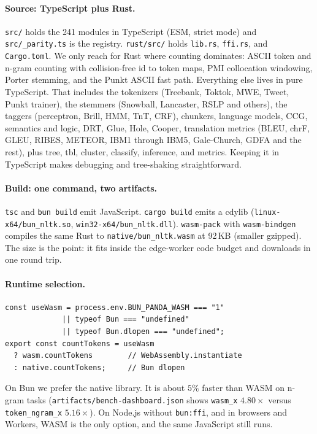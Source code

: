 \documentclass[smallextended]{svjour3}
\begin{document}
\paragraph{Source: TypeScript plus Rust.}
\texttt{src/} holds the 241 modules in TypeScript (ESM, strict mode) and \texttt{src/\_parity.ts} is the registry. \texttt{rust/src/} holds \texttt{lib.rs}, \texttt{ffi.rs}, and \texttt{Cargo.toml}. We only reach for Rust where counting dominates: ASCII token and n-gram counting with collision-free id to token maps, PMI collocation windowing, Porter stemming, and the Punkt ASCII fast path. Everything else lives in pure TypeScript. That includes the tokenizers (Treebank, Toktok, MWE, Tweet, Punkt trainer), the stemmers (Snowball, Lancaster, RSLP and others), the taggers (perceptron, Brill, HMM, TnT, CRF), chunkers, language models, CCG, semantics and logic, DRT, Glue, Hole, Cooper, translation metrics (BLEU, chrF, GLEU, RIBES, METEOR, IBM1 through IBM5, Gale-Church, GDFA and the rest), plus tree, tbl, cluster, classify, inference, and metrics. Keeping it in TypeScript makes debugging and tree-shaking straightforward.

\paragraph{Build: one command, two artifacts.}
\texttt{tsc} and \texttt{bun build} emit JavaScript. \texttt{cargo build} emits a cdylib (\texttt{linux-x64/bun\_nltk.so}, \texttt{win32-x64/bun\_nltk.dll}). \texttt{wasm-pack} with \texttt{wasm-bindgen} compiles the same Rust to \texttt{native/bun\_nltk.wasm} at 92\,KB (smaller gzipped). The size is the point: it fits inside the edge-worker code budget and downloads in one round trip.

\paragraph{Runtime selection.}
\begin{lstlisting}[caption={Runtime binding selection (simplified).},label={lst:binding}]
const useWasm = process.env.BUN_PANDA_WASM === "1"
             || typeof Bun === "undefined"
             || typeof Bun.dlopen === "undefined";
export const countTokens = useWasm
  ? wasm.countTokens        // WebAssembly.instantiate
  : native.countTokens;     // Bun dlopen
\end{lstlisting}
On Bun we prefer the native library. It is about $5\%$ faster than WASM on n-gram tasks (\texttt{artifacts/bench-dashboard.json} shows \texttt{wasm\_x} $4.80\times$ versus \texttt{token\_ngram\_x} $5.16\times$). On Node.js without \texttt{bun:ffi}, and in browsers and Workers, WASM is the only option, and the same JavaScript still runs.
\end{document}
